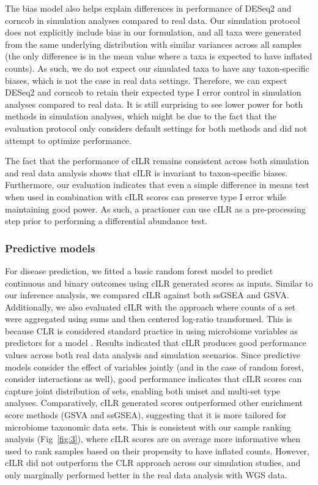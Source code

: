 \documentclass[10pt,letterpaper]{article}
\begin{document}
The bias model also helps explain differences in performance of DESeq2 and corncob in simulation analyses compared to real data. Our simulation protocol does not explicitly include bias in our formulation, and all taxa were generated from the same underlying distribution with similar variances across all samples (the only difference is in the mean value where a taxa is expected to have inflated counts). As such, we do not expect our simulated taxa to have any taxon-specific biases, which is not the case in real data settings. Therefore, we can expect DESeq2 and corncob to retain their expected type I error control in simulation analyses compared to real data. It is still surprising to see lower power for both methods in simulation analyses, which might be due to the fact that the evaluation protocol only considers default settings for both methods and did not attempt to optimize performance. 

The fact that the performance of cILR remains consistent across both simulation and real data analysis shows that cILR is invariant to taxon-specific biases. Furthermore, our evaluation indicates that even a simple difference in means test when used in combination with cILR scores can preserve type I error while maintaining good power. As such, a practioner can use cILR as a pre-processing step prior to performing a differential abundance test.  

\subsubsection*{Predictive models}
For disease prediction, we fitted a basic random forest model \cite{breiman2001} to predict continuous and binary outcomes using cILR generated scores as inputs. Similar to our inference analysis, we compared cILR against both ssGSEA and GSVA. Additionally, we also evaluated cILR with the approach where counts of a set were aggregated using sums and then centered log-ratio transformed. This is because CLR is considered standard practice in using microbiome variables as predictors for a model \cite{gloor2017}. Results indicated that cILR produces good performance values across both real data analysis and simulation scenarios. Since predictive models consider the effect of variables jointly (and in the case of random forest, consider interactions as well), good performance indicates that cILR scores can capture joint distribution of sets, enabling both uniset and multi-set type analyses. Comparatively, cILR generated scores outperformed other enrichment score methods (GSVA and ssGSEA), suggesting that it is more tailored for microbiome taxonomic data sets. This is consistent with our sample ranking analysis (Fig~\ref{fig:3}), where cILR scores are on average more informative when used to rank samples based on their propensity to have inflated counts. However, cILR did not outperform the CLR approach across our simulation studies, and only marginally performed better in the real data analysis with WGS data. 
\end{document}
